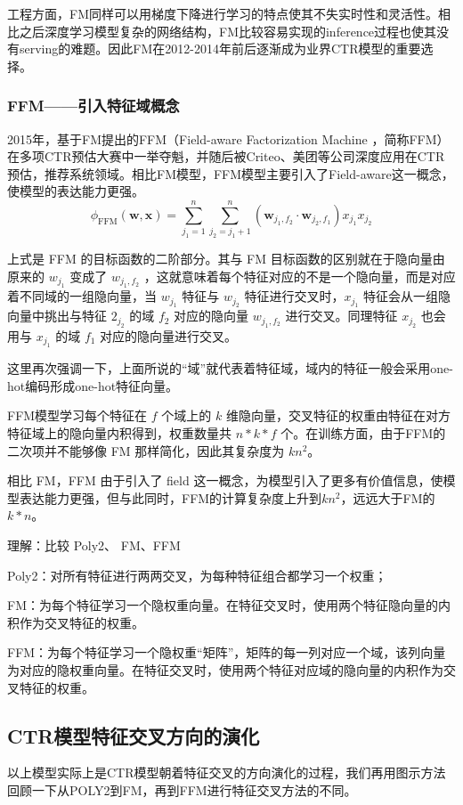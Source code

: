\documentclass[12pt]{article}
\begin{document}
工程方面，FM同样可以用梯度下降进行学习的特点使其不失实时性和灵活性。相比之后深度学习模型复杂的网络结构，FM比较容易实现的inference过程也使其没有serving的难题。因此FM在2012-2014年前后逐渐成为业界CTR模型的重要选择。

\subsubsection{FFM——引入特征域概念}
2015年，基于FM提出的FFM（Field-aware Factorization Machine ，简称FFM）在多项CTR预估大赛中一举夺魁，并随后被Criteo、美团等公司深度应用在CTR预估，推荐系统领域。相比FM模型，FFM模型主要引入了Field-aware这一概念，使模型的表达能力更强。
$$
\phi_{\text{FFM}}(\mathbf{w}, \mathbf{x}) = \sum_{j_1=1}^n\sum_{j_2 = j_1 + 1}^n (\mathbf{w}_{j_1, f_2} \cdot \mathbf{w}_{j_2, f_1})x_{j_1}x_{j_2}
$$

上式是 FFM 的目标函数的二阶部分。其与 FM 目标函数的区别就在于隐向量由原来的 $w_{j_1}$ 变成了 $w_{j_1, f_2}$  ，这就意味着每个特征对应的不是一个隐向量，而是对应着不同域的一组隐向量，当 $w_{j_1}$ 特征与 $w_{j_2}$ 特征进行交叉时，$x_{j_1}$ 特征会从一组隐向量中挑出与特征 $2_{j_2}$ 的域 $f_2$ 对应的隐向量 $w_{j_1, f_2}$ 进行交叉。同理特征 $x_{j_2}$ 也会用与 $x_{j_1}$ 的域 $f_1$ 对应的隐向量进行交叉。

这里再次强调一下，上面所说的“域”就代表着特征域，域内的特征一般会采用one-hot编码形成one-hot特征向量。

FFM模型学习每个特征在 $f$ 个域上的 $k$ 维隐向量，交叉特征的权重由特征在对方特征域上的隐向量内积得到，权重数量共 $n*k*f$ 个。在训练方面，由于FFM的二次项并不能够像 FM 那样简化，因此其复杂度为 $kn^2$。

相比 FM，FFM 由于引入了 field 这一概念，为模型引入了更多有价值信息，使模型表达能力更强，但与此同时，FFM的计算复杂度上升到$kn^2$，远远大于FM的 $k*n$。

\begin{framed}
理解：比较 Poly2、 FM、FFM

Poly2：对所有特征进行两两交叉，为每种特征组合都学习一个权重；

FM：为每个特征学习一个隐权重向量。在特征交叉时，使用两个特征隐向量的内积作为交叉特征的权重。

FFM：为每个特征学习一个隐权重“矩阵”，矩阵的每一列对应一个域，该列向量为对应的隐权重向量。在特征交叉时，使用两个特征对应域的隐向量的内积作为交叉特征的权重。
\end{framed}

\subsection{CTR模型特征交叉方向的演化}
以上模型实际上是CTR模型朝着特征交叉的方向演化的过程，我们再用图示方法回顾一下从POLY2到FM，再到FFM进行特征交叉方法的不同。
\end{document}
